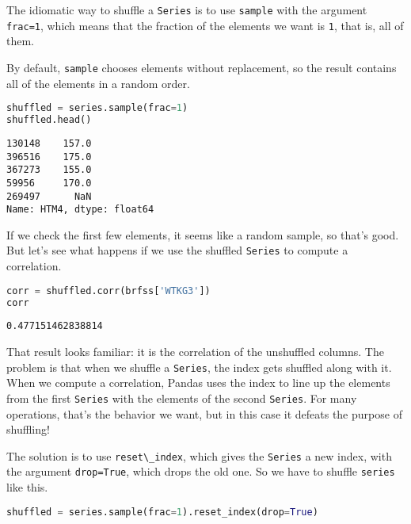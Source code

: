 The idiomatic way to shuffle a \passthrough{\lstinline!Series!} is to
use \passthrough{\lstinline!sample!} with the argument
\passthrough{\lstinline!frac=1!}, which means that the fraction of the
elements we want is \passthrough{\lstinline!1!}, that is, all of them.

\pagebreak

By default, \passthrough{\lstinline!sample!} chooses elements without
replacement, so the result contains all of the elements in a random
order.

\begin{lstlisting}[language=Python,style=source]
shuffled = series.sample(frac=1)
shuffled.head()
\end{lstlisting}

\begin{lstlisting}[style=output]
130148    157.0
396516    175.0
367273    155.0
59956     170.0
269497      NaN
Name: HTM4, dtype: float64
\end{lstlisting}

If we check the first few elements, it seems like a random sample, so
that's good. But let's see what happens if we use the shuffled
\passthrough{\lstinline!Series!} to compute a correlation.

\begin{lstlisting}[language=Python,style=source]
corr = shuffled.corr(brfss['WTKG3'])
corr
\end{lstlisting}

\begin{lstlisting}[style=output]
0.477151462838814
\end{lstlisting}

That result looks familiar: it is the correlation of the unshuffled
columns. The problem is that when we shuffle a
\passthrough{\lstinline!Series!}, the index gets shuffled along with it.
When we compute a correlation, Pandas uses the index to line up the
elements from the first \passthrough{\lstinline!Series!} with the
elements of the second \passthrough{\lstinline!Series!}. For many
operations, that's the behavior we want, but in this case it defeats the
purpose of shuffling!

The solution is to use \passthrough{\lstinline!reset\_index!}, which
gives the \passthrough{\lstinline!Series!} a new index, with the
argument \passthrough{\lstinline!drop=True!}, which drops the old one.
So we have to shuffle \passthrough{\lstinline!series!} like this.

\begin{lstlisting}[language=Python,style=source]
shuffled = series.sample(frac=1).reset_index(drop=True)
\end{lstlisting}


